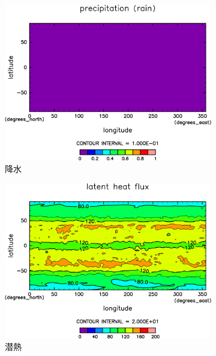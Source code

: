 \documentclass[body]{subfiles}
\begin{document}
\begin{figure}[t]
\begin{subfigure}{.4\textwidth}
		\includegraphics[width=\columnwidth]{S2000/Rain,time=7300:7665-crop-rotate.pdf}
		\caption{降水\hmu*{[W/m^{-2}]}}\label{S2000降水}
	\end{subfigure}
	\begin{subfigure}{.4\textwidth}
		\centering
		\includegraphics[width=\columnwidth]{S2000/Evap,time=7300:7665-crop-rotate.pdf}
		\caption{潜熱\hmu*{[W/m^{-2}]}}\label{S2000潜熱}
	\end{subfigure}
	\begin{subfigure}{.4\textwidth}
		\centering

\end{subfigure}
\end{figure}
\end{document}

